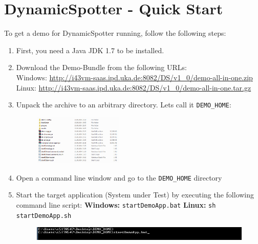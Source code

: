 \documentclass{report}
\newcommand{\DS}{DynamicSpotter }
\newcommand{\link}[1]{\textcolor[rgb]{0.0,0.0,1.0}{\href{#1}{#1}}}
\begin{document}
\newpage
\section{DynamicSpotter - Quick Start}
To get a demo for \DS running, follow the following steps:  
\begin{enumerate}
  \item First, you need a Java JDK 1.7 to be installed.
  \item Download the Demo-Bundle from the following URLs:\\
  	\newline
	\newline
	Windows: \link{http://i43vm-saas.ipd.uka.de:8082/DS/v1\_0/demo-all-in-one.zip}
	\newline
	Linux: \link{http://i43vm-saas.ipd.uka.de:8082/DS/v1\_0/demo-all-in-one.tar.gz}
	\newline
	\newline
  \item Unpack the archive to an arbitrary directory. Lets call it \texttt{DEMO\_HOME}:
  		\begin{figure}[h!]
			\centering
			\includegraphics[width=0.4\textwidth]{figures/quickStart/SNAG-0000.png}
			\label{fig:unpackedArchive}
		\end{figure}
  \item Open a command line window and go to the \texttt{DEMO\_HOME} directory
  \item Start the target application (System under Test) by executing the following command line script:
    \newline
	\newline
	\textbf{Windows:} \texttt{startDemoApp.bat}
	\newline
	\textbf{Linux:} \texttt{sh startDemoApp.sh}

		\begin{figure}[h!]
			\centering
			\includegraphics[width=\textwidth]{figures/quickStart/SNAG-0001.png}
			\label{fig:unpackedArchive}
		\end{figure}
		

\end{enumerate}
\end{document}
